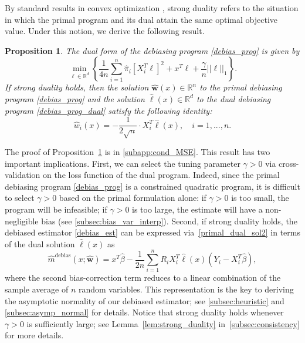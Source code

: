 \documentclass[ejsv2,noshowframe]{imsart}
\theoremstyle{plain}
\newtheorem{proposition}[theorem]{Proposition}
\theoremstyle{definition}
\theoremstyle{remark}
\newcommand{\norm}[1]{\left|\left| #1 \right|\right|}
\renewcommand{\hat}{\widehat}
\begin{document}
By standard results in convex optimization \citep{boyd2004convex}, strong duality refers to the situation in which the primal program and its dual attain the same optimal objective value. Under this notion, we derive the following result.
\begin{proposition}
	\label{prop:dual_debias}
	The dual form of the debiasing program \eqref{debias_prog} is given by
	\begin{equation}
		\label{debias_prog_dual}
		\min_{\ell \in \mathbb{R}^d} \left\{\frac{1}{4n} \sum_{i=1}^n \hat{\pi}_i \left[X_i^T \ell\right]^2 + x^T \ell +\frac{\gamma}{n}\norm{\ell}_1 \right\}.
	\end{equation}
	If strong duality holds, then the solution $\hat{\bm{w}}(x) \in \mathbb{R}^n$ to the primal debiasing program \eqref{debias_prog} and the solution $\hat{\ell}(x) \in \mathbb{R}^d$ to the dual debiasing program \eqref{debias_prog_dual} satisfy the following identity:
	\begin{equation}
		\label{primal_dual_sol2}
		\hat{w}_i(x) = -\frac{1}{2\sqrt{n}} \cdot X_i^T\hat{\ell}(x), \quad i=1,...,n.
	\end{equation}
\end{proposition}

The proof of Proposition~\ref{prop:dual_debias} is in \autoref{subapp:cond_MSE}. This result has two important implications. First, we can select the tuning parameter $\gamma >0$ via cross-validation on the loss function of the dual program. Indeed, since the primal debiasing program \eqref{debias_prog} is a constrained quadratic program, it is difficult to select $\gamma > 0$ based on the primal formulation alone: if $\gamma > 0$ is too small, the program will be infeasible; if $\gamma > 0$ is too large, the estimate will have a non-negligible bias (see \autoref{subsec:bias_var_interp}). Second, if strong duality holds, the debiased estimator \eqref{debias_est} can be expressed via~\eqref{primal_dual_sol2} in terms of the dual solution $\hat{\ell}(x)$ as
\begin{equation}
	\label{debias_est_dual}
	\hat{m}^{\text{debias}}(x;\hat{\bm{w}}) = x^T\hat{\beta} - \frac{1}{2n} \sum_{i=1}^n R_i X_i^T\hat{\ell}(x) \left(Y_i-X_i^T \hat{\beta}\right),
\end{equation}
where the second bias-correction term reduces to a linear combination of the sample average of $n$ random variables. This representation is the key to deriving the asymptotic normality of our debiased estimator; see \autoref{subsec:heuristic} and \autoref{subsec:asymp_normal} for details. Notice that strong duality holds whenever $\gamma > 0$ is sufficiently large; see Lemma~\ref{lem:strong_duality} in~\autoref{subsec:consistency} for more details.
\end{document}
